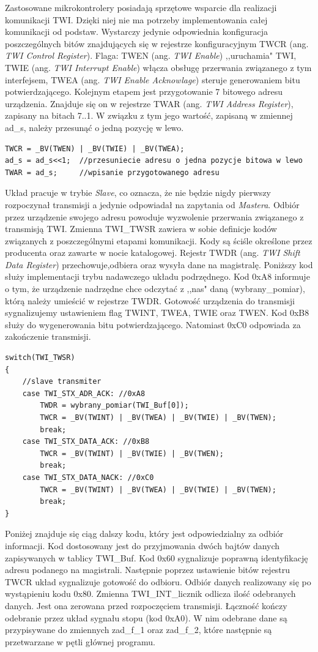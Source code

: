 Zastosowane mikrokontrolery posiadają sprzętowe wsparcie dla realizacji komunikacji TWI. Dzięki niej nie ma potrzeby implementowania całej komunikacji od podstaw. Wystarczy jedynie odpowiednia konfiguracja poszczególnych bitów znajdujących się w rejestrze konfiguracyjnym TWCR (ang. \textit{TWI Control Register})\cite{nota}. Flaga: TWEN (ang. \textit{TWI Enable}) ,,uruchamia" TWI, TWIE (ang. \textit{TWI Interrupt Enable}) włącza obsługę przerwania związanego z tym interfejsem, TWEA (ang. \textit{TWI Enable Acknowlage}) steruje generowaniem bitu potwierdzającego. Kolejnym etapem jest przygotowanie 7 bitowego adresu urządzenia. Znajduje się on w rejestrze TWAR (ang. \textit{TWI Address Register}), zapisany na bitach 7..1. W związku z tym jego wartość, zapisaną w zmiennej ad\_s, należy przesunąć o jedną pozycję w lewo. 
\begin{lstlisting}
TWCR = _BV(TWEN) | _BV(TWIE) | _BV(TWEA);
ad_s = ad_s<<1;  //przesuniecie adresu o jedna pozycje bitowa w lewo
TWAR = ad_s;     //wpisanie przygotowanego adresu
\end{lstlisting}
Układ pracuje w trybie \textit{Slave}, co oznacza, że nie będzie nigdy pierwszy rozpoczynał transmisji a jedynie odpowiadał na zapytania od \textit{Mastera}. Odbiór przez urządzenie swojego adresu powoduje wyzwolenie przerwania związanego z transmisją TWI. Zmienna TWI\_TWSR zawiera w sobie definicje kodów związanych z poszczególnymi etapami komunikacji. Kody są ściśle określone przez producenta oraz zawarte w nocie katalogowej\cite{nota}. Rejestr TWDR (ang. \textit{TWI Shift Data Register}) przechowuje,odbiera oraz wysyła dane na magistralę. Poniższy kod służy implementacji trybu nadawczego układu podrzędnego. Kod 0xA8 informuje o tym, że urządzenie nadrzędne chce odczytać z ,,nas" daną (wybrany\_pomiar), którą należy umieścić w rejestrze TWDR. Gotowość urządzenia do transmisji sygnalizujemy ustawieniem flag TWINT, TWEA, TWIE oraz TWEN. Kod 0xB8 służy do wygenerowania bitu potwierdzającego. Natomiast 0xC0 odpowiada za zakończenie transmisji.
\begin{lstlisting}
switch(TWI_TWSR)
{
	//slave transmiter
	case TWI_STX_ADR_ACK: //0xA8
		TWDR = wybrany_pomiar(TWI_Buf[0]);
		TWCR = _BV(TWINT) | _BV(TWEA) | _BV(TWIE) | _BV(TWEN);
		break;
	case TWI_STX_DATA_ACK: //0xB8
		TWCR = _BV(TWINT) | _BV(TWIE) | _BV(TWEN);
		break;
	case TWI_STX_DATA_NACK: //0xC0
		TWCR = _BV(TWINT) | _BV(TWEA) | _BV(TWIE) | _BV(TWEN);
		break;
}
\end{lstlisting}
Poniżej znajduje się ciąg dalszy kodu, który jest odpowiedzialny za odbiór informacji. Kod dostosowany jest do przyjmowania dwóch bajtów danych zapisywanych w tablicy TWI\_Buf. Kod 0x60 sygnalizuje poprawną identyfikację adresu podanego na magistrali. Następnie poprzez ustawienie bitów rejestru TWCR układ sygnalizuje gotowość do odbioru. Odbiór danych realizowany się po wystąpieniu kodu 0x80. Zmienna TWI\_INT\_licznik odlicza ilość odebranych danych. Jest ona zerowana przed rozpoczęciem transmisji. Łączność kończy odebranie przez układ sygnału stopu (kod 0xA0). W nim odebrane dane są przypisywane do zmiennych zad\_f\_1 oraz zad\_f\_2, które następnie są przetwarzane w pętli głównej programu.
